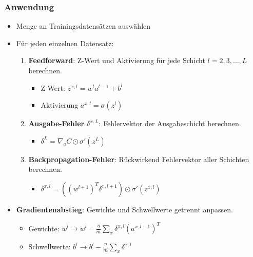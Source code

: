\begin{frame}
\frametitle{Anwendung}

\begin{itemize}
\item Menge an Trainingsdatensätzen auswählen
\item Für jeden einzelnen Datensatz: 

\begin{enumerate}
\item \textbf{Feedforward}: Z-Wert und Aktivierung für jede Schicht $l = 2, 3, \ldots, L$ berechnen. 
\begin{itemize}
	\item Z-Wert: $z^{x,l} = w^l a^{l-1}+b^l$
	\item Aktivierung $a^{x,l} = \sigma(z^{l})$
\end{itemize}

\item \textbf{Ausgabe-Fehler} $\delta^{x,L}$: Fehlervektor der Ausgabeschicht berechnen.
\begin{itemize}
	\item $\delta^{L}  = \nabla_a C \odot \sigma'(z^L)$
\end{itemize}

\item \textbf{Backpropagation-Fehler}: Rückwirkend Fehlervektor aller Schichten berechnen.
\begin{itemize}
	\item $\delta^{x,l} = ((w^{l+1})^T \delta^{x,l+1}) \odot \sigma'(z^{x,l})$
\end{itemize}
\end{enumerate}

\item \textbf{Gradientenabstieg}: Gewichte und Schwellwerte getrennt anpassen. 
\begin{itemize}
	\item Gewichte: $w^l \rightarrow w^l-\frac{\eta}{m} \sum_x \delta^{x,l} (a^{x,l-1})^T$
	\item Schwellwerte: $b^l \rightarrow b^l-\frac{\eta}{m} \sum_x \delta^{x,l}$
\end{itemize}


\end{itemize}

\end{frame}